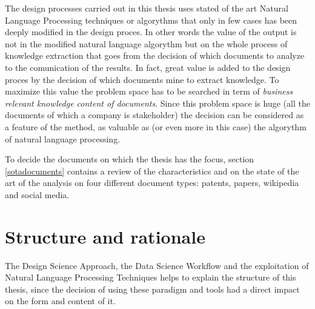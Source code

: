 \documentclass[]{book}
\begin{document}
The design processes carried out in this thesis uses stated of the art
Natural Language Processing techniques or algorythms that only in few
cases has been deeply modified in the design proces. In other words the
value of the output is not in the modified natural language algorythm
but on the whole process of knowledge extraction that goes from the
decision of which documents to analyze to the comunication of the
results. In fact, great value is added to the design proces by the
decision of which documents mine to extract knowledge. To maximize this
value the problem space has to be searched in term of \emph{business
relevant knowledge content of documents}. Since this problem space is
huge (all the documents of which a company is stakeholder) the decision
can be considered as a feature of the method, as valuable as (or even
more in this case) the algorythm of natural language processing.

To decide the documents on which the thesis has the focus, section
\ref{sotadocuments} contains a review of the characteristics and on the
state of the art of the analysis on four different document types:
patents, papers, wikipedia and social media.

\chapter{Structure and rationale}\label{structure-and-rationale}

The Design Science Approach, the Data Science Workflow and the
exploitation of Natural Language Processing Techniques helps to explain
the structure of this thesis, since the decision of using these paradigm
and tools had a direct impact on the form and content of it.
\end{document}
